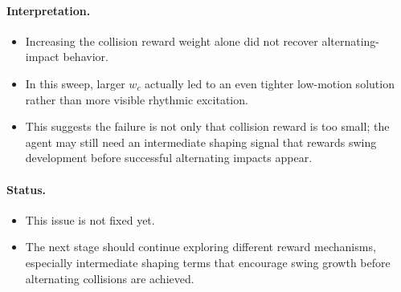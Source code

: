 \documentclass[11pt]{article}
\begin{document}
\paragraph{Interpretation.}
\begin{itemize}[leftmargin=1.5em]
  \item Increasing the collision reward weight alone did not recover alternating-impact behavior.
  \item In this sweep, larger $w_c$ actually led to an even tighter low-motion solution rather than more visible rhythmic excitation.
  \item This suggests the failure is not only that collision reward is too small; the agent may still need an intermediate shaping signal that rewards swing development before successful alternating impacts appear.
\end{itemize}

\paragraph{Status.}
\begin{itemize}[leftmargin=1.5em]
  \item This issue is not fixed yet.
  \item The next stage should continue exploring different reward mechanisms, especially intermediate shaping terms that encourage swing growth before alternating collisions are achieved.
\end{itemize}
\end{document}
